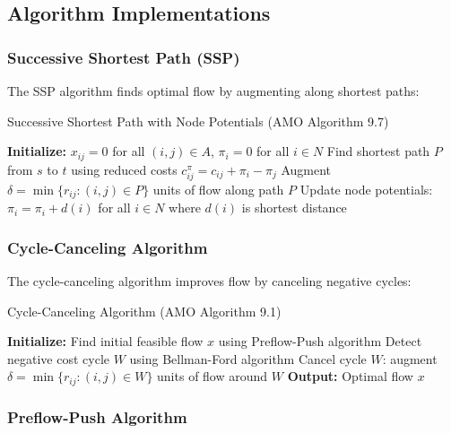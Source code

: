 \documentclass[12pt,a4paper]{article}
\begin{document}
\subsection{Algorithm Implementations}

\subsubsection{Successive Shortest Path (SSP)}

The SSP algorithm finds optimal flow by augmenting along shortest paths:

\begin{algorithm}[H]
\caption{Successive Shortest Path with Node Potentials (AMO Algorithm 9.7)}
\begin{algorithmic}[1]
\STATE \textbf{Initialize:} $x_{ij} = 0$ for all $(i,j) \in A$, $\pi_i = 0$ for all $i \in N$
    \STATE Find shortest path $P$ from $s$ to $t$ using reduced costs $c_{ij}^{\pi} = c_{ij} + \pi_i - \pi_j$
    \STATE Augment $\delta = \min\{r_{ij} : (i,j) \in P\}$ units of flow along path $P$
    \STATE Update node potentials: $\pi_i = \pi_i + d(i)$ for all $i \in N$ where $d(i)$ is shortest distance
\ENDWHILE
\end{algorithmic}
\end{algorithm}

\subsubsection{Cycle-Canceling Algorithm}

The cycle-canceling algorithm improves flow by canceling negative cycles:

\begin{algorithm}[H]
\caption{Cycle-Canceling Algorithm (AMO Algorithm 9.1)}
\begin{algorithmic}[1]
\STATE \textbf{Initialize:} Find initial feasible flow $x$ using Preflow-Push algorithm
    \STATE Detect negative cost cycle $W$ using Bellman-Ford algorithm
    \STATE Cancel cycle $W$: augment $\delta = \min\{r_{ij} : (i,j) \in W\}$ units of flow around $W$
\ENDWHILE
\STATE \textbf{Output:} Optimal flow $x$
\end{algorithmic}
\end{algorithm}

\subsubsection{Preflow-Push Algorithm}
\end{document}

